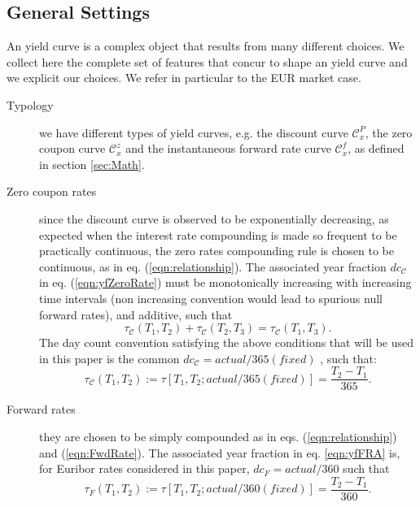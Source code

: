 \documentclass[11pt,reqno]{amsart}
\begin{document}
\subsection{General Settings}
\label{sec:GenSettings}
An yield curve is a complex object that results from many different choices. We collect here the complete set of features that concur to shape an yield curve and we explicit our choices. We refer in particular to the EUR market case.
\begin{description}
  \item[Typology] we have different types of yield curves, e.g. the discount curve $\mathcal{C}_x^P$, the zero coupon curve $\mathcal{C}_x^z$ and the instantaneous forward rate curve $\mathcal{C}_x^f$, as defined in section \ref{sec:Math}.
  \item[Zero coupon rates] since the discount curve is observed to be exponentially decreasing, as expected when the interest rate compounding is made so frequent to be practically continuous, the zero rates compounding rule is chosen to be continuous, as in eq. (\ref{eqn:relationship}). The associated year fraction $dc_{\mathcal{C}}$ in eq. (\ref{eqn:yfZeroRate}) must be monotonically increasing with increasing time intervals (non increasing convention would lead to spurious null forward rates), and additive, such that
      \begin{equation}
          \tau_{\mathcal{C}}\left(T_1,T_2\right) + \tau_{\mathcal{C}}\left(T_2,T_3\right)
          = \tau_{\mathcal{C}}\left(T_1,T_3\right).
      \end{equation}
      The day count convention satisfying the above conditions that will be used in this paper is the common $dc_{\mathcal{C}}= actual/365 (fixed)$ \cite{ISDA}, such that:
      \begin{equation}
          \tau_{\mathcal{C}}\left(T_1,T_2\right)
          := \tau\left[T_1,T_2;actual/365 (fixed)\right]
          = \frac{T_2-T_1}{365}.
      \end{equation}
  \item[Forward rates] they are chosen to be simply compounded as in eqs. (\ref{eqn:relationship}) and (\ref{eqn:FwdRate}). The associated year fraction in eq. \ref{eqn:yfFRA} is, for Euribor rates considered in this paper, $dc_F = actual/360$ \cite{ISDA} such that
      \begin{equation}
          \tau_F\left(T_1,T_2\right) := \tau\left[T_1,T_2;actual/360 (fixed)\right]
          = \frac{T_2-T_1}{360}.
      \end{equation}

\end{description}
\end{document}
